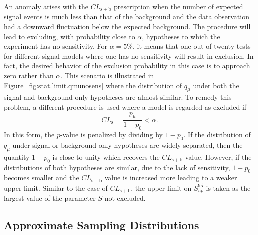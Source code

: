 An anomaly arises with the $CL_\mathrm{s+b}$ prescription when the number of expected signal events is much less than that of 
the background and the data observation had a downward fluctuation below the expected background.
The procedure will lead to excluding, with probability close to $\alpha$, hypotheses to which the experiment has no sensitivity.
For $\alpha=5\%$, it means that one out of twenty tests for different signal models where one has no sensitivity will result in exclusion.
In fact, the desired behavior of the exclusion probability in this case is to approach zero rather than $\alpha$.
This scenario is illustrated in Figure~\ref{fig:stat.limit.qmunosens} where the distribution of $q_{\mu}$
under both the signal and background-only hypotheses are almost similar. 
To remedy this problem, a different procedure is used where a model is regarded as excluded if 
\begin{equation}
  CL_\mathrm{s}  = \frac
{p_{\mu}}
{1-p_{0}}
< \alpha.
\end{equation}
In this form, the $p$-value is penalized by dividing by $1-p_{0}$. 
If the distribution of $q_{\mu}$ under signal or background-only hypotheses are widely separated, then 
the quantity $1-p_{0}$ is close to unity which recovers the $CL_\mathrm{s+b}$ value. However, if
the distributions of both hypotheses are similar, due to the lack of sensitivity, $1-p_{0}$ becomes smaller
and the $CL_\mathrm{s+b}$ value is increased more leading to a weaker upper limit. 
Similar to the case of $CL_\mathrm{s+b}$, the upper limit on $S_{up}^{95}$ is taken as the largest value of the parameter
$S$ not excluded.

\subsection{Approximate Sampling Distributions}

